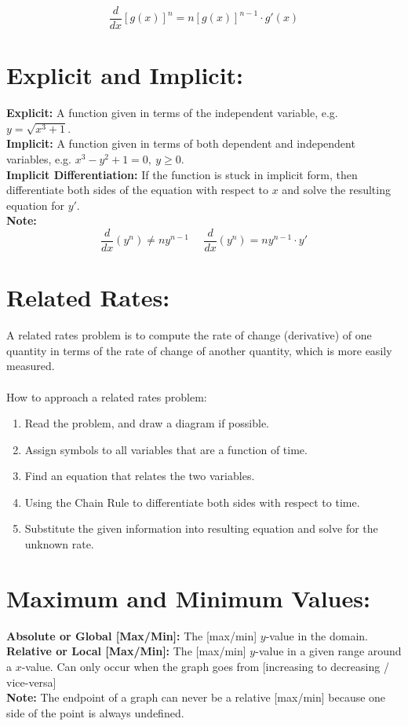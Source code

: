 \documentclass[12pt]{article}
\begin{document}
$$\frac{d}{dx}[g(x)]^n = n[g(x)]^{n-1} \cdot g'(x)$$



\section{Explicit and Implicit:}
\textbf{Explicit: } A function given in terms of the independent variable, e.g. $y=\sqrt{x^3+1}$.\\
\textbf{Implicit: } A function given in terms of both dependent and independent variables, e.g. $x^3-y^2+1=0,~y \geq 0$.\\
\textbf{Implicit Differentiation: } If the function is stuck in implicit form, then differentiate both sides of the equation with respect to $x$ and solve the resulting equation for $y'$.\\
\textbf{Note: }
$$\frac{d}{dx}(y^n) \neq{} ny^{n-1}  ~~~~~~\frac{d}{dx}(y^n) = ny^{n-1} \cdot y'$$

\section{Related Rates:}
A related rates problem is to compute the rate of change (derivative) of one quantity in terms of the rate of change of another quantity, which is more easily measured.
\\\\
\noindent How to approach a related rates problem:
\begin{enumerate}
    \item Read the problem, and draw a diagram if possible.
    \item Assign symbols to all variables that are a function of time.
    \item Find an equation that relates the two variables.
    \item Using the Chain Rule to differentiate both sides with respect to time.
    \item Substitute the given information into resulting equation and solve for the unknown
    rate.
\end{enumerate}

\section{Maximum and Minimum Values:}
\textbf{Absolute or Global [Max/Min]: } The [max/min] $y$-value in the domain. \\
\textbf{Relative or Local [Max/Min]: } The [max/min] $y$-value in a given range around a $x$-value. Can only occur when the graph goes from [increasing to decreasing / vice-versa]\\
\textbf{Note: } The endpoint of a graph can never be a relative [max/min] because one side of the point is always undefined. 
\end{document}
